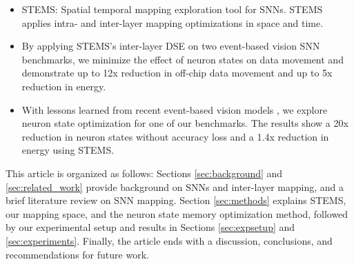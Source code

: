  \begin{itemize}
     \item STEMS: Spatial temporal mapping exploration tool for SNNs. STEMS applies intra- and inter-layer mapping optimizations in space and time. %
     \item By applying STEMS's inter-layer DSE on two event-based vision SNN benchmarks, we minimize the effect of neuron states on data movement and demonstrate up to 12x reduction in off-chip data movement and up to 5x reduction in energy. %
     \item With lessons learned from recent event-based vision models \cite{red,10204090,9749022}, we explore neuron state optimization for one of our benchmarks. The results show a 20x reduction in neuron states without accuracy loss and a 1.4x reduction in energy using STEMS. %
 \end{itemize}

 This article is organized as follows: Sections \ref{sec:background} and \ref{sec:related_work} provide background on SNNs and inter-layer mapping, and a brief literature review on SNN mapping. Section \ref{sec:methods} explains STEMS, our mapping space, and the neuron state memory optimization method, followed by our experimental setup and results in Sections \ref{sec:expsetup} and \ref{sec:experiments}. Finally, the article ends with a discussion, conclusions, and recommendations for future work.
